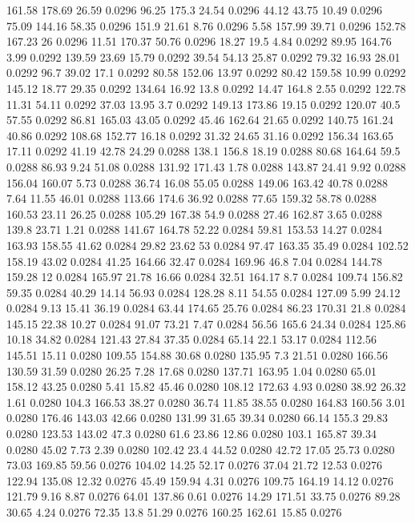 161.58	178.69	26.59	0.0296
96.25	175.3	24.54	0.0296
44.12	43.75	10.49	0.0296
75.09	144.16	58.35	0.0296
151.9	21.61	8.76	0.0296
5.58	157.99	39.71	0.0296
152.78	167.23	26	0.0296
11.51	170.37	50.76	0.0296
18.27	19.5	4.84	0.0292
89.95	164.76	3.99	0.0292
139.59	23.69	15.79	0.0292
39.54	54.13	25.87	0.0292
79.32	16.93	28.01	0.0292
96.7	39.02	17.1	0.0292
80.58	152.06	13.97	0.0292
80.42	159.58	10.99	0.0292
145.12	18.77	29.35	0.0292
134.64	16.92	13.8	0.0292
14.47	164.8	2.55	0.0292
122.78	11.31	54.11	0.0292
37.03	13.95	3.7	0.0292
149.13	173.86	19.15	0.0292
120.07	40.5	57.55	0.0292
86.81	165.03	43.05	0.0292
45.46	162.64	21.65	0.0292
140.75	161.24	40.86	0.0292
108.68	152.77	16.18	0.0292
31.32	24.65	31.16	0.0292
156.34	163.65	17.11	0.0292
41.19	42.78	24.29	0.0288
138.1	156.8	18.19	0.0288
80.68	164.64	59.5	0.0288
86.93	9.24	51.08	0.0288
131.92	171.43	1.78	0.0288
143.87	24.41	9.92	0.0288
156.04	160.07	5.73	0.0288
36.74	16.08	55.05	0.0288
149.06	163.42	40.78	0.0288
7.64	11.55	46.01	0.0288
113.66	174.6	36.92	0.0288
77.65	159.32	58.78	0.0288
160.53	23.11	26.25	0.0288
105.29	167.38	54.9	0.0288
27.46	162.87	3.65	0.0288
139.8	23.71	1.21	0.0288
141.67	164.78	52.22	0.0284
59.81	153.53	14.27	0.0284
163.93	158.55	41.62	0.0284
29.82	23.62	53	0.0284
97.47	163.35	35.49	0.0284
102.52	158.19	43.02	0.0284
41.25	164.66	32.47	0.0284
169.96	46.8	7.04	0.0284
144.78	159.28	12	0.0284
165.97	21.78	16.66	0.0284
32.51	164.17	8.7	0.0284
109.74	156.82	59.35	0.0284
40.29	14.14	56.93	0.0284
128.28	8.11	54.55	0.0284
127.09	5.99	24.12	0.0284
9.13	15.41	36.19	0.0284
63.44	174.65	25.76	0.0284
86.23	170.31	21.8	0.0284
145.15	22.38	10.27	0.0284
91.07	73.21	7.47	0.0284
56.56	165.6	24.34	0.0284
125.86	10.18	34.82	0.0284
121.43	27.84	37.35	0.0284
65.14	22.1	53.17	0.0284
112.56	145.51	15.11	0.0280
109.55	154.88	30.68	0.0280
135.95	7.3	21.51	0.0280
166.56	130.59	31.59	0.0280
26.25	7.28	17.68	0.0280
137.71	163.95	1.04	0.0280
65.01	158.12	43.25	0.0280
5.41	15.82	45.46	0.0280
108.12	172.63	4.93	0.0280
38.92	26.32	1.61	0.0280
104.3	166.53	38.27	0.0280
36.74	11.85	38.55	0.0280
164.83	160.56	3.01	0.0280
176.46	143.03	42.66	0.0280
131.99	31.65	39.34	0.0280
66.14	155.3	29.83	0.0280
123.53	143.02	47.3	0.0280
61.6	23.86	12.86	0.0280
103.1	165.87	39.34	0.0280
45.02	7.73	2.39	0.0280
102.42	23.4	44.52	0.0280
42.72	17.05	25.73	0.0280
73.03	169.85	59.56	0.0276
104.02	14.25	52.17	0.0276
37.04	21.72	12.53	0.0276
122.94	135.08	12.32	0.0276
45.49	159.94	4.31	0.0276
109.75	164.19	14.12	0.0276
121.79	9.16	8.87	0.0276
64.01	137.86	0.61	0.0276
14.29	171.51	33.75	0.0276
89.28	30.65	4.24	0.0276
72.35	13.8	51.29	0.0276
160.25	162.61	15.85	0.0276
